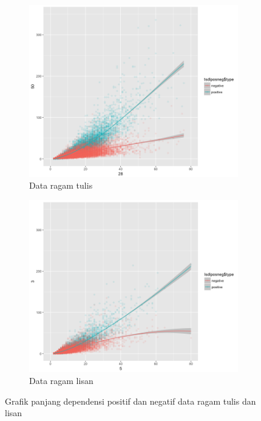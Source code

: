\begin{figure}
\centering

\begin{subfigure}{.8\linewidth}
  \centering
  \includegraphics[width=1\linewidth] {pics/tulis_DLposneg.png} 
	\caption{Data ragam tulis}
	\label{fig:tulis_DLposneg} 
\end{subfigure}
%
\begin{subfigure}{.8\linewidth}
  \centering
  \includegraphics[width=1\linewidth]{pics/lisan_DLposneg.png} 
	\caption{Data ragam lisan}
	\label{fig:lisan_DLposneg} 
\end{subfigure}

\caption{Grafik panjang dependensi positif dan negatif data ragam tulis dan lisan}
\label{fig:DL_posneg}
\end{figure}

